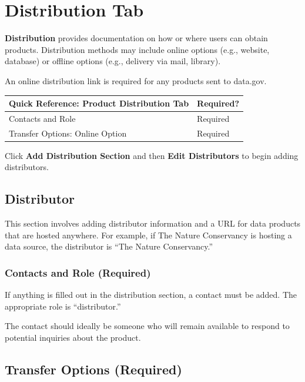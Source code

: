 \documentclass[
]{book}
\begin{document}
\hypertarget{product-distribution}{%
\section*{Distribution Tab}\label{product-distribution}}

\textbf{Distribution} provides documentation on how or where users can obtain products. Distribution methods may include online options (e.g., website, database) or offline options (e.g., delivery via mail, library).

An online distribution link is required for any products sent to data.gov.

\begin{longtable}[]{@{}ll@{}}
\toprule
Quick Reference: Product Distribution Tab & Required?\tabularnewline
\midrule
\endhead
Contacts and Role & Required\tabularnewline
Transfer Options: Online Option & Required\tabularnewline
\bottomrule
\end{longtable}

Click \textbf{Add Distribution Section} and then \textbf{Edit Distributors} to begin adding distributors.

\hypertarget{distributor}{%
\subsection*{Distributor}\label{distributor}}

This section involves adding distributor information and a URL for data products that are hosted anywhere. For example, if The Nature Conservancy is hosting a data source, the distributor is ``The Nature Conservancy.''

\hypertarget{contacts-and-role-required}{%
\subsubsection*{Contacts and Role (Required)}\label{contacts-and-role-required}}

If anything is filled out in the distribution section, a contact must be added. The appropriate role is ``distributor.''

The contact should ideally be someone who will remain available to respond to potential inquiries about the product.

\hypertarget{transfer-options-required}{%
\subsection*{Transfer Options (Required)}\label{transfer-options-required}}
\end{document}
